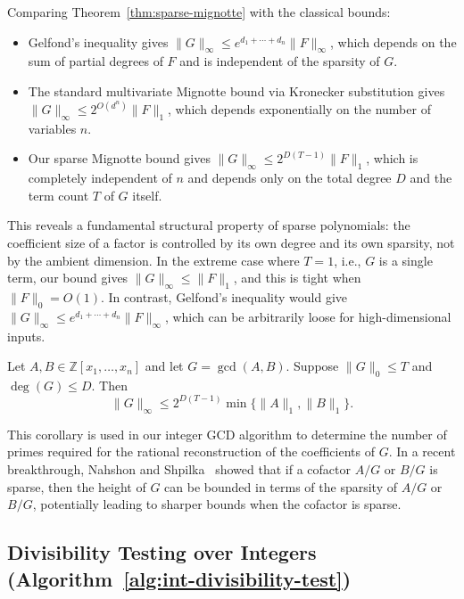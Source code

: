 \documentclass{article}
\numberwithin{equation}{section}
\begin{document}
\begin{remark}
Comparing Theorem~\ref{thm:sparse-mignotte} with the classical bounds:

\begin{itemize}
    \item Gelfond's inequality gives $\|G\|_\infty \le e^{d_1+\cdots+d_n}\|F\|_\infty$, which depends on the sum of partial degrees of $F$ and is independent of the sparsity of $G$.
    \item The standard multivariate Mignotte bound via Kronecker substitution gives $\|G\|_\infty \le 2^{O(d^n)}\|F\|_1$, which depends exponentially on the number of variables $n$.
    \item Our sparse Mignotte bound gives $\|G\|_\infty \le 2^{D(T-1)}\|F\|_1$, which is completely independent of $n$ and depends only on the total degree $D$ and the term count $T$ of $G$ itself.
\end{itemize}

This reveals a fundamental structural property of sparse polynomials: the coefficient size of a factor is controlled by its own degree and its own sparsity, not by the ambient dimension. In the extreme case where $T = 1$, i.e., $G$ is a single term, our bound gives $\|G\|_\infty \le \|F\|_1$, and this is tight when $\|F\|_0 = O(1)$. 
%
In contrast, Gelfond's inequality would give $\|G\|_\infty \le e^{d_1+\cdots+d_n}\|F\|_\infty$, which can be arbitrarily loose for high-dimensional inputs.
\end{remark}

\begin{corollary}\label{cor:gcd-coeff-bound}
Let $A, B \in \mathbb{Z}[x_1, \dots, x_n]$ and let $G = \gcd(A, B)$. Suppose $\|G\|_0 \le T$ and $\deg(G) \le D$. Then
\[
\|G\|_\infty \le 2^{D(T-1)} \min\{\|A\|_1,\|B\|_1\}.
\]
\end{corollary}

This corollary is used in our integer GCD algorithm to determine the number of primes required for the rational reconstruction of the coefficients of $G$.
%
In a recent breakthrough, Nahshon and Shpilka~\cite{NahshonShpilka2026} showed that if a cofactor $A/G$ or $B/G$ is sparse, then the height of $G$ can be bounded in terms of the sparsity of $A/G$ or $B/G$, potentially leading to sharper bounds when the cofactor is sparse.


\subsection{Divisibility Testing over Integers (Algorithm~\ref{alg:int-divisibility-test})}
\label{sec:int-divisibility}
\end{document}
